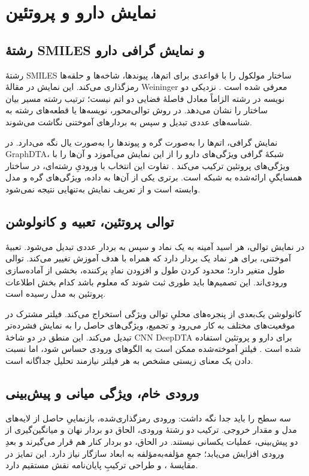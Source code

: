 \section{نمایش دارو و پروتئین}
\label{sec:representations}
\subsection{رشتهٔ SMILES و نمایش گرافی دارو}
رشتهٔ SMILES ساختار مولکول را با قواعدی برای اتم‌ها، پیوندها، شاخه‌ها و حلقه‌ها رمزگذاری می‌کند. این نمایش در مقالهٔ Weininger معرفی شده است \cite{Weininger88SMILES}. نزدیکی دو نویسه در رشته الزاماً معادل فاصلهٔ فضایی دو اتم نیست؛ ترتیب رشته مسیر بیان ساختار را نشان می‌دهد. در روش توالی‌محور، نویسه‌ها یا قطعه‌های رشته به شناسه‌های عددی تبدیل و سپس به بردارهای آموختنی نگاشت می‌شوند.

نمایش گرافی، اتم‌ها را به‌صورت گره و پیوندها را به‌صورت یال نگه می‌دارد. در GraphDTA، شبکهٔ گرافی ویژگی‌های دارو را از این نمایش می‌آموزد و آن‌ها را با ویژگی‌های پروتئین ترکیب می‌کند \cite{Nguyen21GraphDTA}. تفاوت این انتخاب با ورودیِ رشته‌ای، در ساختار همسایگیِ ارائه‌شده به شبکه است. برتری یکی از آن‌ها به داده، ویژگی‌های گره و مدل وابسته است و از تعریف نمایش به‌تنهایی نتیجه نمی‌شود.

\subsection{توالی پروتئین، تعبیه و کانولوشن}
در نمایش توالی، هر اسید آمینه به یک نماد و سپس به بردار عددی تبدیل می‌شود. تعبیهٔ آموختنی، برای هر نماد یک بردار دارد که همراه با هدف آموزش تغییر می‌کند. توالی طول متغیر دارد؛ محدود کردن طول و افزودن نمادِ پرکننده، بخشی از آماده‌سازی ورودی‌اند. این تصمیم‌ها باید طوری ثبت شوند که معلوم باشد کدام بخش اطلاعات پروتئین به مدل رسیده است.

کانولوشن یک‌بعدی از پنجره‌های محلیِ توالی ویژگی استخراج می‌کند. فیلتر مشترک در موقعیت‌های مختلف به کار می‌رود و تجمیع، ویژگی‌های حاصل را به نمایش فشرده‌تر تبدیل می‌کند. این منطق در دو شاخهٔ CNNِ DeepDTA برای دارو و پروتئین استفاده شده است \cite{Ozturk18DeepDTA}. فیلترِ آموخته‌شده ممکن است به الگوهای ورودی حساس شود، اما نسبت دادن یک معنای زیستی مشخص به هر فیلتر نیازمند تحلیل جداگانه است.

\subsection{ورودی خام، ویژگی میانی و پیش‌بینی}
سه سطح را باید جدا نگه داشت: ورودی رمزگذاری‌شده، بازنماییِ حاصل از لایه‌های مدل و مقدار خروجی. ترکیب دو رشتهٔ ورودی، الحاق دو بردار نهان و میانگین‌گیری از دو پیش‌بینی، عملیات یکسانی نیستند. در الحاق، دو بردار کنار هم قرار می‌گیرند و بعدِ ورودی افزایش می‌یابد؛ جمعِ مؤلفه‌به‌مؤلفه به ابعاد سازگار نیاز دارد. این تمایز در مقایسهٔ ،  و طراحی ترکیبِ پایان‌نامه نقش مستقیم دارد.


